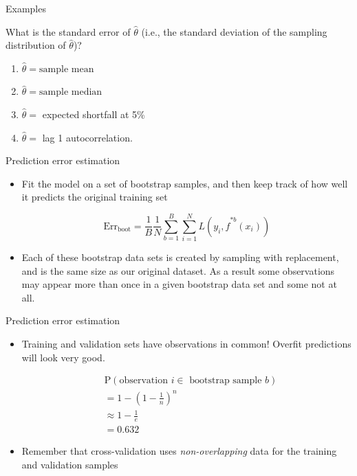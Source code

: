 \documentclass[14pt]{beamer}
\begin{document}
\begin{frame}[plain]{Examples}

What is the standard error of $\hat\theta$ (i.e., the standard deviation of the sampling distribution of $\hat \theta$)?

\begin{enumerate}
	\item $\hat \theta = \text{sample mean}$ 

	\item $\hat \theta = \text{sample median}$

\item $\hat\theta = $ expected shortfall at 5\%

\item $\hat\theta=$ lag 1 autocorrelation.
\end{enumerate}



\end{frame}



\begin{frame}[plain]{Prediction error estimation}

\begin{itemize}
	\item Fit the model on a set of bootstrap samples, and then keep track of how well it predicts the original training set
	
	$$ \text{Err}_{\text{boot}} = \frac1B \frac1N \sum_{b = 1}^B \sum_{i = 1}^N L(y_i, \hat f^{*b}(x_i))$$ 
	\pause
	\item Each of these bootstrap data sets is created by sampling with replacement, and is the same size as our original dataset. As a result some observations may appear more than once in a given bootstrap data set and some not at all.
\end{itemize}

\end{frame}

\begin{frame}[plain]{Prediction error estimation}
%

\begin{itemize}
	\item Training and validation sets have observations in common! Overfit predictions will look very good.
	
	
\begin{align*}
	&\text{P}(\text{observation~} i \in \text{~bootstrap sample~} b) \\
	&= 1 - (1 - \frac1n)^n \\
	&\approx 1 - \frac1e \\
	&= 0.632
\end{align*}
	
	\item Remember that cross-validation uses \emph{non-overlapping} data for the training and validation samples
\end{itemize}



\end{frame}
\end{document}
